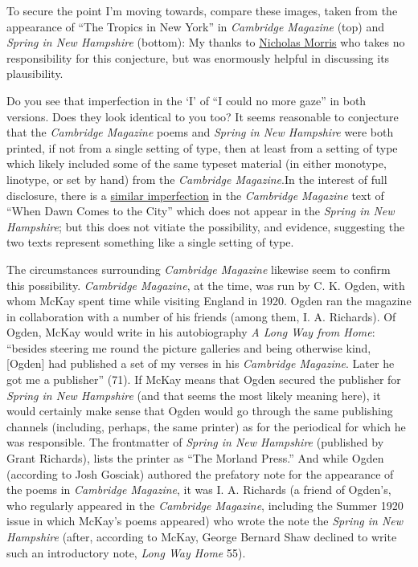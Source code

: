 \documentclass[
  12pt,
]{article}
\begin{document}
To secure the point I'm moving towards, compare these images, taken from
the appearance of ``The Tropics in New York'' in \emph{Cambridge
Magazine} (top) and \emph{Spring in New Hampshire} (bottom): {My thanks
to \href{http://twitter.com/nickmimic}{Nicholas Morris} who takes no
responsibility for this conjecture, but was enormously helpful in
discussing its plausibility.}

Do you see that imperfection in the `I' of ``I could no more gaze'' in
both versions. Does they look identical to you too? It seems reasonable
to conjecture that the \emph{Cambridge Magazine} poems and \emph{Spring
in New Hampshire} were both printed, if not from a single setting of
type, then at least from a setting of type which likely included some of
the same typeset material (in either monotype, linotype, or set by hand)
from the \emph{Cambridge Magazine}.{In the interest of full disclosure,
there is a
\href{/images/harlem-shadows/when-dawn_comparison.png}{similar
imperfection} in the \emph{Cambridge Magazine} text of ``When Dawn Comes
to the City'' which does not appear in the \emph{Spring in New
Hampshire}; but this does not vitiate the possibility, and evidence,
suggesting the two texts represent something like a single setting of
type.}

The circumstances surrounding \emph{Cambridge Magazine} likewise seem to
confirm this possibility. \emph{Cambridge Magazine}, at the time, was
run by C. K. Ogden, with whom McKay spent time while visiting England in
1920. Ogden ran the magazine in collaboration with a number of his
friends (among them, I. A. Richards). Of Ogden, McKay would write in his
autobiography \emph{A Long Way from Home}: ``besides steering me round
the picture galleries and being otherwise kind, {[}Ogden{]} had
published a set of my verses in his \emph{Cambridge Magazine}. Later he
got me a publisher'' (71). If McKay means that Ogden secured the
publisher for \emph{Spring in New Hampshire} (and that seems the most
likely meaning here), it would certainly make sense that Ogden would go
through the same publishing channels (including, perhaps, the same
printer) as for the periodical for which he was responsible. {The
frontmatter of \emph{Spring in New Hampshire} (published by Grant
Richards), lists the printer as ``The Morland Press.''} And while Ogden
(according to Josh Gosciak) authored the prefatory note for the
appearance of the poems in \emph{Cambridge Magazine}, it was I. A.
Richards (a friend of Ogden's, who regularly appeared in the
\emph{Cambridge Magazine}, including the Summer 1920 issue in which
McKay's poems appeared) who wrote the note the \emph{Spring in New
Hampshire} (after, according to McKay, George Bernard Shaw declined to
write such an introductory note, \emph{Long Way Home} 55).
\end{document}
